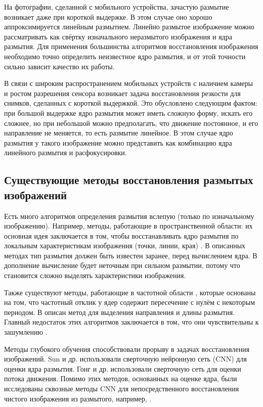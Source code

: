 \par
На фотографии, сделанной с мобильного устройства, зачастую размытие возникает даже при короткой выдержке. В этом случае оно хорошо аппроксимируется линейным размытием. Линейно размытое изображение можно рассматривать как свёртку изначального неразмытого изображения и ядра размытия. Для применения большинства алгоритмов восстановления изображения необходимо точно определить неизвестное ядро размытия, и от этой точности сильно зависит качество их работы.
\par
В связи с широким распространением мобильных устройств с наличием камеры и ростом разрешения сенсора возникает задача восстановления резкости для снимков, сделанных с короткой выдержкой. Это обусловлено следующим фактом: при большой выдержке ядро размытия может иметь сложную форму, искать его сложнее, но при небольшой можно предполагать, что движение постоянное, и его направление не меняется, то есть размытие линейное. В этом случае ядро размытия у такого изображение можно представить как комбинацию ядра линейного размытия и расфокусировки. 

\subsection{Существующие методы восстановления размытых изображений}
Есть много алгоритмов определения размытия вслепую (только по изначальному изображению). Например, методы, работающие в пространственной области: их основная идея заключается в том, чтобы восстанавливать ядро размытия по локальным характеристикам изображения (точки, линии, края) \cite{kopeika, chalmond, Wu}. В описанных методах тип размытия должен быть известен заранее, перед вычислением ядра. 
В дополнение вычисление будет неточным при сильном размытии, потому что становится сложно выделять характеристики изображения. 

Также существуют методы, работающие в частотной области \cite{rom, cannon}, которые основаны на том, что частотный отклик у ядер содержит пересечение с нулём с некоторым периодом. В \cite{lokh} описан метод для выделения направления и длины размытия. Главный недостаток этих алгоритмов заключается в том, что они чувствительны к зашумлению \cite{kundur}.
\par

Методы глубокого обучения способствовали
прорыву в задачах восстановления изображений. Sun и др. \cite{sun} использовали сверточную нейронную сеть (CNN) для оценки ядра размытия. Гонг и др. \cite{gong} использовали сверточную
сеть для оценки потока движения. Помимо этих методов, основанных на оценке ядра, были исследованы сквозные методы CNN для непосредственного восстановления чистого изображения из размытого, например, \cite{nah, mehdi}. 

